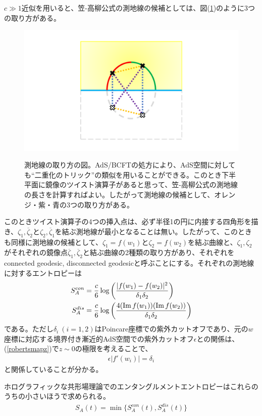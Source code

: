 $c\gg 1$近似を用いると、笠-高柳公式の測地線の候補としては、図(\ref{fig:sqrtsurfacecontraction})のように3つの取り方がある。
\begin{figure}[h]
	\centering
	\includegraphics[width=0.7\linewidth]{SQRTsurfacecontraction.pdf}
	\label{fig:sqrtsurfacecontraction}
	\caption{測地線の取り方の図。AdS/BCFTの処方により、AdS空間に対しても``二重化のトリック''の類似を用いることができる。このとき下半平面に鏡像のツイスト演算子があると思って、笠-高柳公式の測地線の長さを計算すればよい。したがって測地線の候補として、オレンジ・紫・青の3つの取り方がある。}
\end{figure}

このときツイスト演算子の4つの挿入点は、必ず半径1の円に内接する四角形を描き、$\zeta_1,\overline{\zeta}_2$と$\zeta_2,\overline{\zeta}_1$を結ぶ測地線が最小となることは無い。したがって、このときも同様に測地線の候補として、$\zeta_1=f(w_1)$と$\zeta_2=f(w_2)$を結ぶ曲線と、$\zeta_1,\zeta_2$がそれぞれの鏡像点$\overline{\zeta}_1,\overline{\zeta}_2$と結ぶ曲線の2種類の取り方があり、それぞれをconnected geodesic, disconnected geodesicと呼ぶことにする。それぞれの測地線に対するエントロピーは
\begin{align}
S^{con}_A&=\frac{c}{6}\log\left(\frac{|f(w_1)-f(w_2)|^2}{\delta_1\delta_2}\right)\\
S^{dis}_A&=\frac{c}{6}\log\left(\frac{4(\text{Im}\, f(w_1))(\text{Im}\, f(w_2))}{\delta_1\delta_2}\right)
\end{align}
である。ただし$\delta_i\ (i=1,2)$はPoincare座標での紫外カットオフであり、元の$w$座標に対応する境界付き漸近的AdS空間での紫外カットオフ$\epsilon$との関係は、(\ref{robertsmapz})で$z\sim 0$の極限を考えることで、
\begin{align}
\epsilon |f'(w_i)|=\delta_i\label{cutofftransf}
\end{align}
と関係していることが分かる。

ホログラフィックな共形場理論でのエンタングルメントエントロピーはこれらのうちの小さいほうで求められる。
\begin{align}
S_A(t)=\min \{S^{con}_A(t),S^{dis}_A(t) \}
\end{align}

